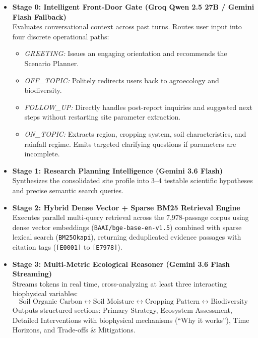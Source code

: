 \documentclass[11pt,a4paper]{article}
\begin{document}
\begin{itemize}[leftmargin=1.5em, itemsep=5pt]
    \item \textbf{Stage 0: Intelligent Front-Door Gate (Groq Qwen 2.5 27B / Gemini Flash Fallback)}\\
    Evaluates conversational context across past turns. Routes user input into four discrete operational paths:
    \begin{itemize}[itemsep=2pt]
        \item \textit{GREETING:} Issues an engaging orientation and recommends the Scenario Planner.
        \item \textit{OFF\_TOPIC:} Politely redirects users back to agroecology and biodiversity.
        \item \textit{FOLLOW\_UP:} Directly handles post-report inquiries and suggested next steps without restarting site parameter extraction.
        \item \textit{ON\_TOPIC:} Extracts region, cropping system, soil characteristics, and rainfall regime. Emits targeted clarifying questions if parameters are incomplete.
    \end{itemize}

    \item \textbf{Stage 1: Research Planning Intelligence (Gemini 3.6 Flash)}\\
    Synthesizes the consolidated site profile into 3--4 testable scientific hypotheses and precise semantic search queries.

    \item \textbf{Stage 2: Hybrid Dense Vector + Sparse BM25 Retrieval Engine}\\
    Executes parallel multi-query retrieval across the 7,978-passage corpus using dense vector embeddings (\texttt{BAAI/bge-base-en-v1.5}) combined with sparse lexical search (\texttt{BM25Okapi}), returning deduplicated evidence passages with citation tags (\texttt{[E0001]} to \texttt{[E7978]}).

    \item \textbf{Stage 3: Multi-Metric Ecological Reasoner (Gemini 3.6 Flash Streaming)}\\
    Streams tokens in real time, cross-analyzing at least three interacting biophysical variables:
    \begin{equation}
        \text{Soil Organic Carbon} \longleftrightarrow \text{Soil Moisture} \longleftrightarrow \text{Cropping Pattern} \longleftrightarrow \text{Biodiversity}
    \end{equation}
    Outputs structured sections: Primary Strategy, Ecosystem Assessment, Detailed Interventions with biophysical mechanisms (``Why it works''), Time Horizons, and Trade-offs \& Mitigations.


\end{itemize}
\end{document}
